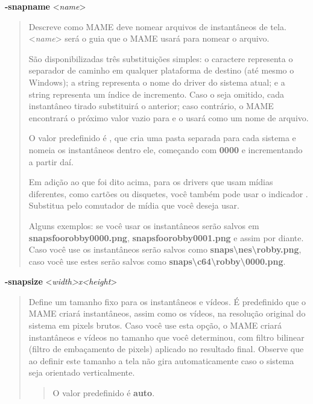 \documentclass[letterpaper,10pt,brazil]{sphinxmanual}
\begin{document}
\label{commandline/commandline-all:mame-commandline-snapname}
\textbf{-snapname} \textless{}\emph{name}\textgreater{}
\begin{quote}

Descreve como MAME deve nomear arquivos de instantâneos de tela.
\textless{}\emph{name}\textgreater{} será o guia que o MAME usará para nomear o arquivo.

São disponibilizadas três substituições simples: o caractere \sphinxcode{/}
representa o separador de caminho em qualquer plataforma de destino
(até mesmo o Windows); a string  representa o nome do driver
do sistema atual; e a string  representa um índice de
incremento. Caso o  seja omitido, cada instantâneo tirado
substituirá o anterior; caso contrário, o MAME encontrará o próximo
valor vazio para  e o usará como um nome de arquivo.

O valor predefinido é , que cria uma pasta separada para
cada sistema e nomeia os instantâneos dentro ele, começando com
\textbf{0000} e incrementando a partir daí.

Em adição ao que foi dito acima, para os drivers que usam mídias
diferentes, como cartões ou disquetes, você também pode usar o
indicador . Substitua \sphinxcode{{[}media{]}} pelo comutador de
mídia que você deseja usar.

Alguns exemplos: se você usar  os
instantâneos serão salvos em \textbf{snapsfoorobby0000.png},
\textbf{snapsfoorobby0001.png} e assim por diante. Caso você use
 os instantâneos serão
salvos como \textbf{snaps\textbackslash{}nes\textbackslash{}robby.png}, caso você use
 estes serão
salvos como \textbf{snaps\textbackslash{}c64\textbackslash{}robby\textbackslash{}0000.png}.
\end{quote}
\label{commandline/commandline-all:mame-commandline-snapsize}
\textbf{-snapsize} \textless{}\emph{width\textgreater{}x\textless{}height}\textgreater{}
\begin{quote}

Define um tamanho fixo para os instantâneos e vídeos.
É predefinido que o MAME criará instantâneos, assim como os vídeos,
na resolução original do sistema em pixels brutos. Caso você use
esta opção, o MAME criará instantâneos e vídeos no tamanho que você
determinou, com filtro bilinear (filtro de embaçamento de pixels)
aplicado no resultado final. Observe que ao definir este tamanho a
tela não gira automaticamente caso o sistema seja orientado
verticalmente.
\begin{quote}

O valor predefinido é \textbf{auto}.
\end{quote}
\end{quote}
\end{document}
